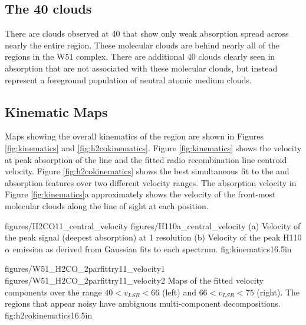 \subsection{The 40 \kms clouds}
There are clouds observed at 40 \kms that show only weak \formaldehyde
absorption spread across nearly the entire region.  These molecular clouds are
behind nearly all of the \hii regions in the W51 complex.  There are additional
40 \kms clouds clearly seen in \hi absorption \citep{Stil2006a} that are not
associated with these molecular clouds, but instead represent a foreground
population of neutral atomic medium clouds.

\subsection{Kinematic Maps}
\label{sec:kinematics}
Maps showing the overall kinematics of the region are shown in Figures
\ref{fig:kinematics} and \ref{fig:h2cokinematics}.  Figure \ref{fig:kinematics}
shows the velocity at peak absorption of the \formaldehyde \oneone line and the
fitted radio recombination line centroid velocity.  Figure
\ref{fig:h2cokinematics} shows the best simultaneous fit to the \formaldehyde
\oneone and \twotwo absorption features over two different velocity ranges.
The \oneone absorption velocity in Figure \ref{fig:kinematics}a approximately
shows the velocity of the front-most molecular clouds along the line of sight
at each position.

\FigureTwoAA
{figures/H2CO11_central_velocity}
{figures/H110a_central_velocity}
{(a) Velocity of the peak \formaldehyde \oneone signal (deepest absorption) at
1 \kms resolution
(b) Velocity of the peak H110$\alpha$ emission as derived from Gaussian fits
to each spectrum.}
{fig:kinematics}{1}{6.5in}

\FigureTwoAA
{figures/W51_H2CO_2parfittry11_velocity1}
{figures/W51_H2CO_2parfittry11_velocity2}
{Maps of the fitted \formaldehyde velocity components over the range $40 <
v_{LSR} < 66$ \kms (left) and $66 < v_{LSR} < 75$ \kms (right).  The regions
that appear noisy have ambiguous multi-component decompositions.  }
{fig:h2cokinematics}{1}{6.5in}

